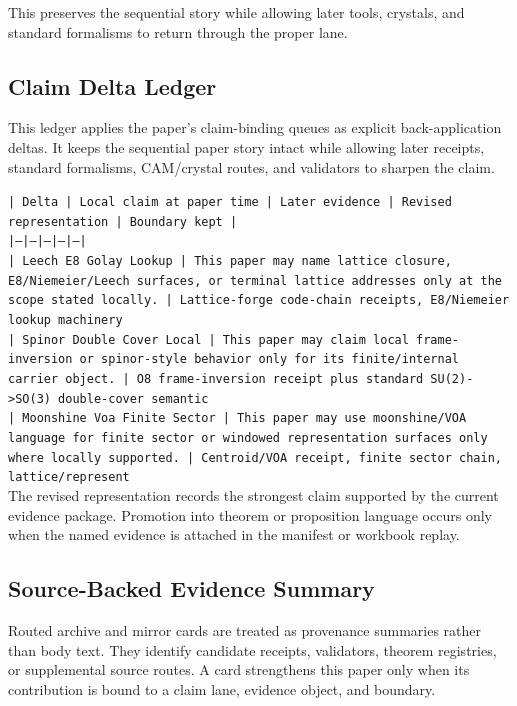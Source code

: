 \documentclass[11pt]{article}
\begin{document}
This preserves the sequential story while allowing later tools, crystals, and
standard formalisms to return through the proper lane.

\subsection*{Claim Delta Ledger}

This ledger applies the paper's claim-binding queues as explicit back-application
deltas. It keeps the sequential paper story intact while allowing later
receipts, standard formalisms, CAM/crystal routes, and validators to sharpen the
claim.

\noindent\texttt{| Delta | Local claim at paper time | Later evidence | Revised representation | Boundary kept |}\\
\noindent\texttt{|---|---|---|---|---|}\\
\noindent\texttt{| Leech E8 Golay Lookup | This paper may name lattice closure, E8/Niemeier/Leech surfaces, or terminal lattice addresses only at the scope stated locally. | Lattice-forge code-chain receipts, E8/Niemeier lookup machinery}\\
\noindent\texttt{| Spinor Double Cover Local | This paper may claim local frame-inversion or spinor-style behavior only for its finite/internal carrier object. | O8 frame-inversion receipt plus standard SU(2)->SO(3) double-cover semantic}\\
\noindent\texttt{| Moonshine Voa Finite Sector | This paper may use moonshine/VOA language for finite sector or windowed representation surfaces only where locally supported. | Centroid/VOA receipt, finite sector chain, lattice/represent}\\

The revised representation records the strongest claim supported by the current evidence package. Promotion into theorem or proposition language occurs only when the named evidence is attached in the manifest or workbook replay.

\subsection*{Source-Backed Evidence Summary}

Routed archive and mirror cards are treated as provenance summaries rather than
body text. They identify candidate receipts, validators, theorem registries, or
supplemental source routes. A card strengthens this paper only when its
contribution is bound to a claim lane, evidence object, and boundary.
\end{document}
